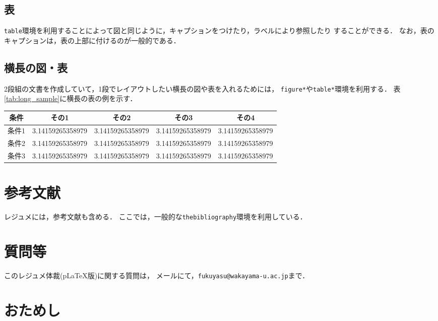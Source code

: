\documentclass[twocolumn]{jarticle} %
\begin{document}
\subsection{表}

{\tt table}環境を利用することによって図と同じように，キャプションをつけたり，ラベルにより参照したり
することができる．
なお，表のキャプションは，表の上部に付けるのが一般的である．

\subsection{横長の図・表}

2段組の文書を作成していて，1段でレイアウトしたい横長の図や表を入れるためには，
\verb|figure*|や\verb|table*|環境を利用する．
表\ref{tab:long_sample}に横長の表の例を示す．

\begin{table*}
  \caption{横長の表}\label{tab:long_sample}
  \centering
  \begin{tabular}{lrrrr}
  \hline
  \multicolumn{1}{c}{条件} & \multicolumn{1}{c}{その1} & \multicolumn{1}{c}{その2} & \multicolumn{1}{c}{その3} & \multicolumn{1}{c}{その4}\\ 
  \hline
  条件1 & 3.14159265358979 & 3.14159265358979 & 3.14159265358979 & 3.14159265358979\\
  条件2 & 3.14159265358979 & 3.14159265358979 & 3.14159265358979 & 3.14159265358979\\
  条件3 & 3.14159265358979 & 3.14159265358979 & 3.14159265358979 & 3.14159265358979\\
  \hline
  \end{tabular}
\end{table*}

\section{参考文献}

レジュメには，参考文献も含める．
ここでは，一般的な\verb|thebibliography|環境を利用している．

\section{質問等}

このレジュメ体裁(p\LaTeX 版)に関する質問は，
メールにて，\verb|fukuyasu@wakayama-u.ac.jp|まで．

\section{おためし}
\end{document}
